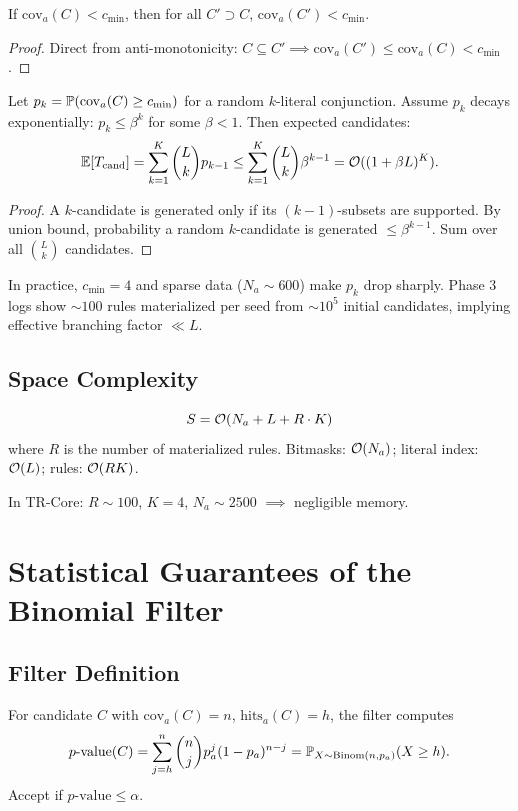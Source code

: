 \begin{lemma}
If $\mathrm{cov}_a(C) < c_{\min}$, then for all $C' \supset C$, $\mathrm{cov}_a(C') < c_{\min}$.
\end{lemma}
\begin{proof}
Direct from anti-monotonicity: $C \subseteq C' \implies \mathrm{cov}_a(C') \leq \mathrm{cov}_a(C) < c_{\min}$.
\end{proof}

\begin{theorem}
Let $p_k = \mathbb{P}(\mathrm{cov}_a(C) \geq c_{\min})$ for a random $k$-literal conjunction. Assume $p_k$ decays exponentially: $p_k \leq \beta^k$ for some $\beta < 1$. Then expected candidates:
\[
\mathbb{E}[T_{\text{cand}}] = \sum_{k=1}^K \binom{L}{k} p_{k-1} \leq \sum_{k=1}^K \binom{L}{k} \beta^{k-1} = \mathcal{O}((1+\beta L)^K).
\]
\end{theorem}
\begin{proof}
A $k$-candidate is generated only if its $(k-1)$-subsets are supported. By union bound, probability a random $k$-candidate is generated $\leq \beta^{k-1}$. Sum over all $\binom{L}{k}$ candidates.
\end{proof}

\begin{remark}
In practice, $c_{\min}=4$ and sparse data ($N_a \sim 600$) make $p_k$ drop sharply. Phase 3 logs show $\sim 100$ rules materialized per seed from $\sim 10^5$ initial candidates, implying effective branching factor $\ll L$.
\end{remark}

\subsection{Space Complexity}

\begin{theorem}
\[
S = \mathcal{O}(N_a + L + R \cdot K)
\]
where $R$ is the number of materialized rules. Bitmasks: $\mathcal{O}(N_a)$; literal index: $\mathcal{O}(L)$; rules: $\mathcal{O}(R K)$.
\end{theorem}
In TR-Core: $R \sim 100$, $K=4$, $N_a \sim 2500$ $\implies$ negligible memory.

\section{Statistical Guarantees of the Binomial Filter}

\subsection{Filter Definition}
For candidate $C$ with $\mathrm{cov}_a(C) = n$, $\mathrm{hits}_a(C) = h$, the filter computes
\[
p\text{-value}(C) = \sum_{j=h}^n \binom{n}{j} p_a^j (1-p_a)^{n-j} = \mathbb{P}_{X \sim \mathrm{Binom}(n, p_a)}(X \geq h).
\]
Accept if $p\text{-value} \leq \alpha$.

